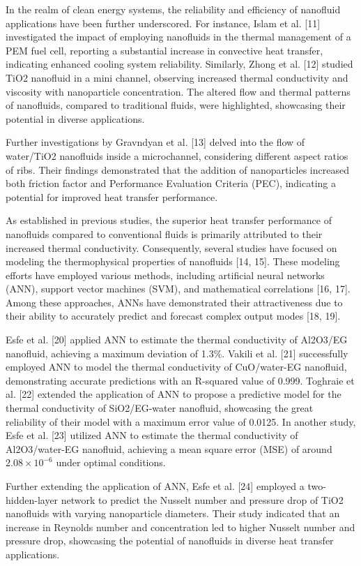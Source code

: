 \documentclass{article}
\begin{document}
In the realm of clean energy systems, the reliability and efficiency of nanofluid applications have been further underscored. For instance, Islam et al. [11] investigated the impact of employing nanofluids in the thermal management of a PEM fuel cell, reporting a substantial increase in convective heat transfer, indicating enhanced cooling system reliability. Similarly, Zhong et al. [12] studied TiO2 nanofluid in a mini channel, observing increased thermal conductivity and viscosity with nanoparticle concentration. The altered flow and thermal patterns of nanofluids, compared to traditional fluids, were highlighted, showcasing their potential in diverse applications.

Further investigations by Gravndyan et al. [13] delved into the flow of water/TiO2 nanofluids inside a microchannel, considering different aspect ratios of ribs. Their findings demonstrated that the addition of nanoparticles increased both friction factor and Performance Evaluation Criteria (PEC), indicating a potential for improved heat transfer performance.

As established in previous studies, the superior heat transfer performance of nanofluids compared to conventional fluids is primarily attributed to their increased thermal conductivity. Consequently, several studies have focused on modeling the thermophysical properties of nanofluids [14, 15]. These modeling efforts have employed various methods, including artificial neural networks (ANN), support vector machines (SVM), and mathematical correlations [16, 17]. Among these approaches, ANNs have demonstrated their attractiveness due to their ability to accurately predict and forecast complex output modes [18, 19].

Esfe et al. [20] applied ANN to estimate the thermal conductivity of Al2O3/EG nanofluid, achieving a maximum deviation of 1.3\%. Vakili et al. [21] successfully employed ANN to model the thermal conductivity of CuO/water-EG nanofluid, demonstrating accurate predictions with an R-squared value of 0.999. Toghraie et al. [22] extended the application of ANN to propose a predictive model for the thermal conductivity of SiO2/EG-water nanofluid, showcasing the great reliability of their model with a maximum error value of 0.0125. In another study, Esfe et al. [23] utilized ANN to estimate the thermal conductivity of Al2O3/water-EG nanofluid, achieving a mean square error (MSE) of around \(2.08 \times 10^{-6}\) under optimal conditions.

Further extending the application of ANN, Esfe et al. [24] employed a two-hidden-layer network to predict the Nusselt number and pressure drop of TiO2 nanofluids with varying nanoparticle diameters. Their study indicated that an increase in Reynolds number and concentration led to higher Nusselt number and pressure drop, showcasing the potential of nanofluids in diverse heat transfer applications.
\end{document}

